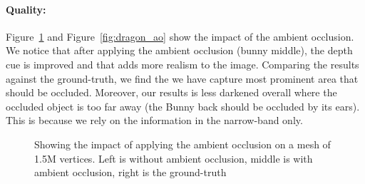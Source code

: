 \documentclass[a4paper,10pt]{article}
\begin{document}
\paragraph{Quality:} 

Figure~\ref{fig:bunny_ao} and Figure~\ref{fig:dragon_ao} show the impact of the ambient occlusion. We notice that after applying the ambient occlusion (bunny middle), the depth cue is improved and that adds more realism to the image. Comparing the results against the ground-truth, we find the we have capture most prominent area that should be occluded. Moreover, our results is less darkened overall where the occluded object is too far away (the Bunny back should be occluded by its ears). This is because we rely on the information in the narrow-band only.

\begin{figure}[!tbh]
\centering        
   \caption{Showing the impact of applying the ambient occlusion on a mesh of 1.5M vertices. Left is without ambient occlusion, middle is with ambient occlusion, right is the ground-truth}
   \label{fig:bunny_ao}
\end{figure}
\end{document}
